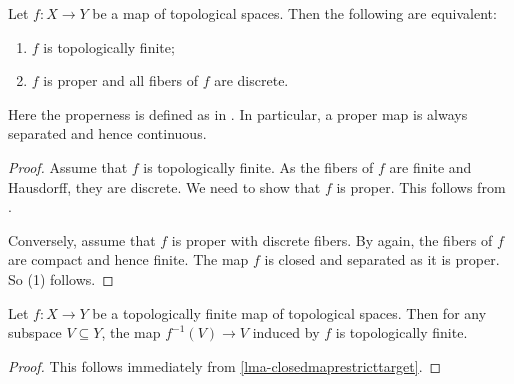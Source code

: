 \begin{proposition}\label{prop-topfinitechar}
    Let $f:X\rightarrow Y$ be a map of topological spaces. Then the following are equivalent:
    \begin{enumerate}
        \item $f$ is topologically finite;
        \item $f$ is proper and all fibers of $f$ are discrete.
    \end{enumerate}
\end{proposition}
Here the properness is defined as in \cite[\href{https://stacks.math.columbia.edu/tag/005O}{Tag 005O}]{stacks-project}. In particular, a proper map is always separated and hence continuous.
\begin{proof}
    Assume that $f$ is topologically finite. As the fibers of $f$ are finite and Hausdorff, they are discrete.
    We need to show that $f$ is proper. This follows from \cite[\href{https://stacks.math.columbia.edu/tag/005R}{Tag 005R}]{stacks-project}.

    Conversely, assume that $f$ is proper with discrete fibers. By \cite[\href{https://stacks.math.columbia.edu/tag/005R}{Tag 005R}]{stacks-project} again, the fibers of $f$ are compact and hence finite. The map $f$ is closed and separated as it is proper. So (1) follows.
\end{proof}

\begin{proposition}
    Let $f:X\rightarrow Y$ be a topologically finite map of topological spaces. Then for any subspace $V\subseteq Y$, the map $f^{-1}(V)\rightarrow V$ induced by $f$ is topologically finite.
\end{proposition}
\begin{proof}
    This follows immediately from \cref{lma-closedmaprestricttarget}.
\end{proof}


